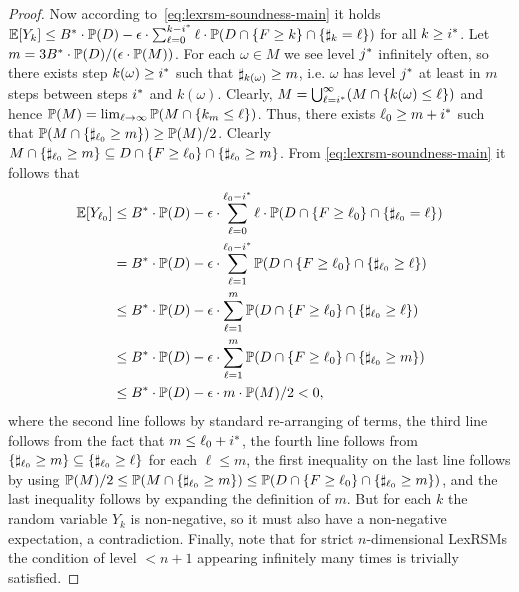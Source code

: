 \begin{proof}
Now according to~\eqref{eq:lexrsm-soundness-main} it holds  $\mathbb{E}[Y_k]\leq {B}^*\cdot \mathbb{P}(D) - \epsilon\cdot\sum_{\ell=0}^{k-{i}^*} \ell\cdot\mathbb{P}(D 
\cap \{F\geq k\} \cap \{\sharp_k 
= 
\ell\})$ for all $k\geq {i}^*$. Let $m=3{B}^*\cdot \mathbb{P}(D)/(\epsilon\cdot \mathbb{P}(M))$. For each $\omega\in M$ we see level ${j}^*$ infinitely often, so there exists step $k(\omega)\geq {i}^*$ such that $\sharp_{k(\omega)}\geq m$, i.e. $\omega$ has level ${j}^* $ at least in $m$ steps between steps ${i}^*$ and $k(\omega)$. Clearly, $M = \bigcup_{\ell={i}^*}^{\infty} (M \cap \{k(\omega) \leq \ell\})$ and hence $\mathbb{P}(M)=\lim_{\ell\rightarrow \infty}\mathbb{P}(M \cap \{k_{m} \leq \ell\})$. Thus, there exists $\ell_0 \geq m+{i}^*$ such that $\mathbb{P}(M \cap \{\sharp_{\ell_0}\geq m\}) \geq \mathbb{P}(M)/2$. Clearly $M \cap \{\sharp_{\ell_0}\geq m\} \subseteq D\cap \{F\geq \ell_0 \} \cap \{\sharp_{\ell_0}\geq m \}$. From \eqref{eq:lexrsm-soundness-main} it follows that
\begin{align*}
\mathbb{E}[Y_{\ell_0}]&\leq {B}^*\cdot \mathbb{P}(D) - \epsilon\cdot\sum_{\ell=0}^{\ell_0-{i}^*} \ell\cdot\mathbb{P}(D 
\cap \{F\geq \ell_0\} \cap \{\sharp_{\ell_0} 
=
\ell\}) \\
&= {B}^*\cdot \mathbb{P}(D) - \epsilon\cdot \sum_{\ell=1}^{\ell_0-{i}^*} \mathbb{P}(D 
\cap \{F\geq \ell_0\} \cap \{\sharp_{\ell_0} 
\geq 
\ell\})\\
& \leq {B}^*\cdot \mathbb{P}(D) - \epsilon\cdot \sum_{\ell=1}^{m} \mathbb{P}(D 
\cap \{F\geq \ell_0\} \cap \{\sharp_{\ell_0} 
\geq 
\ell\}) \\&\leq {B}^*\cdot \mathbb{P}(D) - \epsilon\cdot \sum_{\ell=1}^{m} \mathbb{P}(D 
\cap \{F\geq \ell_0\} \cap \{\sharp_{\ell_0} 
\geq 
m\})\\
&\leq {B}^*\cdot \mathbb{P}(D) - \epsilon\cdot m \cdot \mathbb{P}(M)/2 < 0, 
\end{align*}where the second line follows by standard re-arranging of terms, the third line follows from the fact that $m\leq \ell_0 + {i}^*$, the fourth line follows from $\{\sharp_{\ell_0} 
\geq 
m \} \subseteq\{ \sharp_{\ell_0} 
\geq 
\ell\}$ for each $\ell \leq m$, the first inequality on the last line follows 
by  using $\mathbb{P}(M)/2\leq \mathbb{P}(M \cap \{\sharp_{\ell_0}\geq m\}) \leq 
\mathbb{P}(D\cap \{F\geq \ell_0 \} \cap \{\sharp_{\ell_0}\geq m \})$, and
the last inequality follows by expanding the definition of $m$. But for each $k$ the random variable $Y_k$ is non-negative, so it must also have a non-negative expectation, a contradiction. Finally, note that for strict $n$-dimensional LexRSMs the condition of level $<n+1$ appearing infinitely many times is trivially satisfied.
\end{proof}

